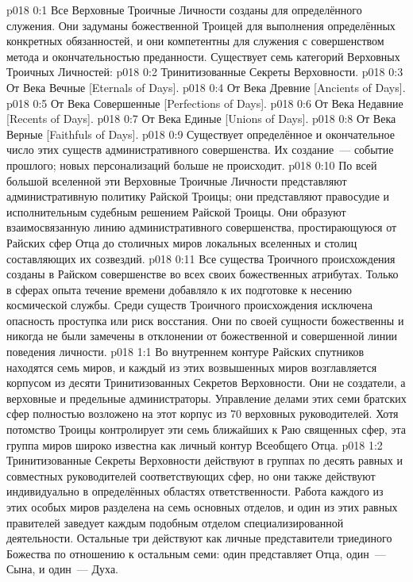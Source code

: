 \author{Божественный Советник}
\vs p018 0:1 Все Верховные Троичные Личности созданы для определённого служения. Они задуманы божественной Троицей для выполнения определённых конкретных обязанностей, и они компетентны для служения с совершенством метода и окончательностью преданности. Существует семь категорий Верховных Троичных Личностей:
\vs p018 0:2 Тринитизованные Секреты Верховности.
\vs p018 0:3 От Века Вечные [Eternals of Days].
\vs p018 0:4 От Века Древние [Ancients of Days].
\vs p018 0:5 От Века Совершенные [Perfections of Days].
\vs p018 0:6 От Века Недавние [Recents of Days].
\vs p018 0:7 От Века Единые [Unions of Days].
\vs p018 0:8 От Века Верные [Faithfuls of Days].
\vs p018 0:9 \pc Существует определённое и окончательное число этих существ административного совершенства. Их создание~--- событие прошлого; новых персонализаций больше не происходит.
\vs p018 0:10 По всей большой вселенной эти Верховные Троичные Личности представляют административную политику Райской Троицы; они представляют правосудие и  исполнительным судебным решением Райской Троицы. Они образуют взаимосвязанную линию административного совершенства, простирающуюся от Райских сфер Отца до столичных миров локальных вселенных и столиц составляющих их созвездий.
\vs p018 0:11 Все существа Троичного происхождения созданы в Райском совершенстве во всех своих божественных атрибутах. Только в сферах опыта течение времени добавляло к их подготовке к несению космической службы. Среди существ Троичного происхождения исключена опасность проступка или риск восстания. Они по своей сущности божественны и никогда не были замечены в отклонении от божественной и совершенной линии поведения личности.
\vs p018 1:1 Во внутреннем контуре Райских спутников находятся семь миров, и каждый из этих возвышенных миров возглавляется корпусом из десяти Тринитизованных Секретов Верховности. Они не создатели, а верховные и предельные администраторы. Управление делами этих семи братских сфер полностью возложено на этот корпус из 70 верховных руководителей. Хотя потомство Троицы контролирует эти семь ближайших к Раю священных сфер, эта группа миров широко известна как личный контур Всеобщего Отца.
\vs p018 1:2 Тринитизованные Секреты Верховности действуют в группах по десять равных и совместных руководителей соответствующих сфер, но они также действуют индивидуально в определённых областях ответственности. Работа каждого из этих особых миров разделена на семь основных отделов, и один из этих равных правителей заведует каждым подобным отделом специализированной деятельности. Остальные три действуют как личные представители триединого Божества по отношению к остальным семи: один представляет Отца, один~--- Сына, и один~--- Духа.
